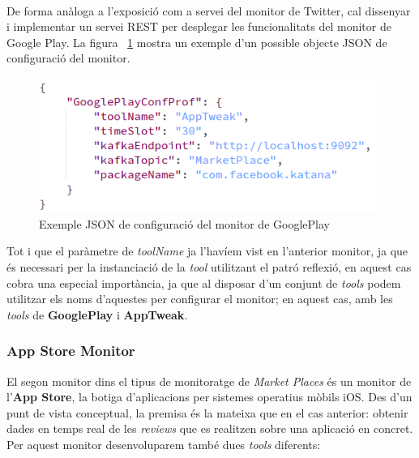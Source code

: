 \\

De forma anàloga a l'exposició com a servei del monitor de Twitter, cal dissenyar i implementar un servei REST per desplegar les funcionalitats del monitor de Google Play. La figura ~\ref{fig:Figura14} mostra un exemple d'un possible objecte JSON de configuració del monitor.\\

\begin{figure}[!h]
\centering
\includegraphics[width=11cm]{Figures/Figure14}
\decoRule
\caption[Exemple JSON de configuració del monitor de GooglePlay]{Exemple JSON de configuració del monitor de GooglePlay}
\label{fig:Figura14}
\end{figure}

Tot i que el paràmetre de \textit{toolName} ja l'havíem vist en l'anterior monitor, ja que és necessari per la instanciació de la \textit{tool} utilitzant el patró reflexió, en aquest cas cobra una especial importància, ja que al disposar d'un conjunt de \textit{tools} podem utilitzar els noms d'aquestes per configurar el monitor; en aquest cas, amb les \textit{tools} de \textbf{GooglePlay} i \textbf{AppTweak}.\\

\subsubsection{App Store Monitor}

El segon monitor dins el tipus de monitoratge de \textit{Market Places} és un monitor de l'\textbf{App Store}, la botiga d'aplicacions per sistemes operatius mòbils iOS. Des d'un punt de vista conceptual, la premisa és la mateixa que en el cas anterior: obtenir dades en temps real de les \textit{reviews} que es realitzen sobre una aplicació en concret.\\

Per aquest monitor desenvoluparem també dues \textit{tools} diferents:

